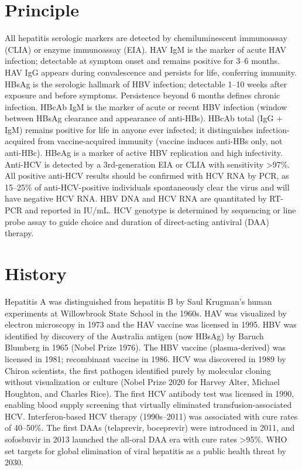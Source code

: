 \section*{Principle}
All hepatitis serologic markers are detected by chemiluminescent immunoassay (CLIA) or enzyme immunoassay (EIA). HAV IgM is the marker of acute HAV infection; detectable at symptom onset and remains positive for 3--6 months. HAV IgG appears during convalescence and persists for life, conferring immunity. HBsAg is the serologic hallmark of HBV infection; detectable 1--10 weeks after exposure and before symptoms. Persistence beyond 6 months defines chronic infection. HBcAb IgM is the marker of acute or recent HBV infection (window between HBsAg clearance and appearance of anti-HBs). HBcAb total (IgG + IgM) remains positive for life in anyone ever infected; it distinguishes infection-acquired from vaccine-acquired immunity (vaccine induces anti-HBs only, not anti-HBc). HBeAg is a marker of active HBV replication and high infectivity. Anti-HCV is detected by a 3rd-generation EIA or CLIA with sensitivity >97\%. All positive anti-HCV results should be confirmed with HCV RNA by PCR, as 15--25\% of anti-HCV-positive individuals spontaneously clear the virus and will have negative HCV RNA. HBV DNA and HCV RNA are quantitated by RT-PCR and reported in IU/mL. HCV genotype is determined by sequencing or line probe assay to guide choice and duration of direct-acting antiviral (DAA) therapy.

\section*{History}
Hepatitis A was distinguished from hepatitis B by Saul Krugman's human experiments at Willowbrook State School in the 1960s. HAV was visualized by electron microscopy in 1973 and the HAV vaccine was licensed in 1995. HBV was identified by discovery of the Australia antigen (now HBsAg) by Baruch Blumberg in 1965 (Nobel Prize 1976). The HBV vaccine (plasma-derived) was licensed in 1981; recombinant vaccine in 1986. HCV was discovered in 1989 by Chiron scientists, the first pathogen identified purely by molecular cloning without visualization or culture (Nobel Prize 2020 for Harvey Alter, Michael Houghton, and Charles Rice). The first HCV antibody test was licensed in 1990, enabling blood supply screening that virtually eliminated transfusion-associated HCV. Interferon-based HCV therapy (1990s--2011) was associated with cure rates of 40--50\%. The first DAAs (telaprevir, boceprevir) were introduced in 2011, and sofosbuvir in 2013 launched the all-oral DAA era with cure rates >95\%. WHO set targets for global elimination of viral hepatitis as a public health threat by 2030.

